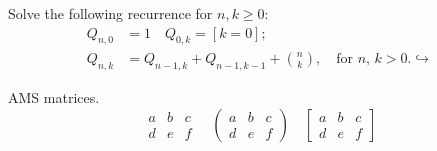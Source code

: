 \documentclass{article}
\begin{document}
Solve the following recurrence for $ n,k\geq 0 $:
\begin{align*}
Q_{n,0} &= 1 \quad Q_{0,k} = [k=0]; \\
Q_{n,k} &= Q_{n-1,k}+Q_{n-1,k-1}+\binom{n}{k},
\quad\text{for $n$, $k>0$.}↪
\end{align*}

AMS matrices.
\[
\begin{matrix}
a & b & c \\
d & e & f
\end{matrix}
\quad
\begin{pmatrix}
a & b & c \\
d & e & f
\end{pmatrix}
\quad
\begin{bmatrix}
a & b & c \\
d & e & f
\end{bmatrix}
\]
\end{document}
